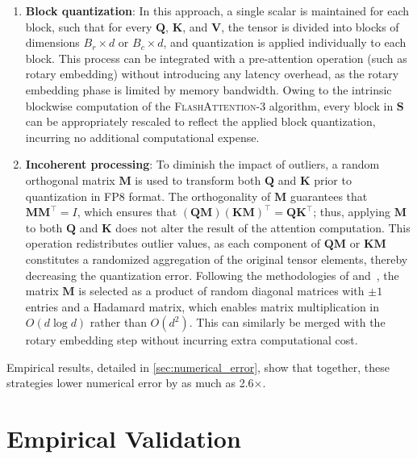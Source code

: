 \begin{enumerate}

\item \textbf{Block quantization}: In this approach, a single scalar is maintained for each block, such that for every $\mathbf{Q}$, $\mathbf{K}$, and $\mathbf{V}$, the tensor is divided into blocks of dimensions $B_r \times d$ or $B_c \times d$, and quantization is applied individually to each block. This process can be integrated with a pre-attention operation (such as rotary embedding) without introducing any latency overhead, as the rotary embedding phase is limited by memory bandwidth. Owing to the intrinsic blockwise computation of the \textsc{FlashAttention-3} algorithm, every block in $\mathbf{S}$ can be appropriately rescaled to reflect the applied block quantization, incurring no additional computational expense.

\item \textbf{Incoherent processing}: To diminish the impact of outliers, a random orthogonal matrix $\mathbf{M}$ is used to transform both $\mathbf{Q}$ and $\mathbf{K}$ prior to quantization in FP8 format. The orthogonality of $\mathbf{M}$ guarantees that $\mathbf{M} \mathbf{M}^\top = I$, which ensures that $(\mathbf{Q} \mathbf{M}) (\mathbf{K} \mathbf{M})^\top = \mathbf{Q} \mathbf{K}^\top$; thus, applying $\mathbf{M}$ to both $\mathbf{Q}$ and $\mathbf{K}$ does not alter the result of the attention computation. This operation redistributes outlier values, as each component of $\mathbf{Q} \mathbf{M}$ or $\mathbf{K} \mathbf{M}$ constitutes a randomized aggregation of the original tensor elements, thereby decreasing the quantization error. Following the methodologies of \citet{chee2024quip} and~\citet{tseng2024quip}, the matrix $\mathbf{M}$ is selected as a product of random diagonal matrices with $\pm 1$ entries and a Hadamard matrix, which enables matrix multiplication in $O(d \log d)$ rather than $O(d^2)$. This can similarly be merged with the rotary embedding step without incurring extra computational cost.
\end{enumerate}

Empirical results, detailed in \cref{sec:numerical_error}, show that together, these strategies lower numerical error by as much as 2.6$\times$.

\section{Empirical Validation}
\label{sec:exp}

